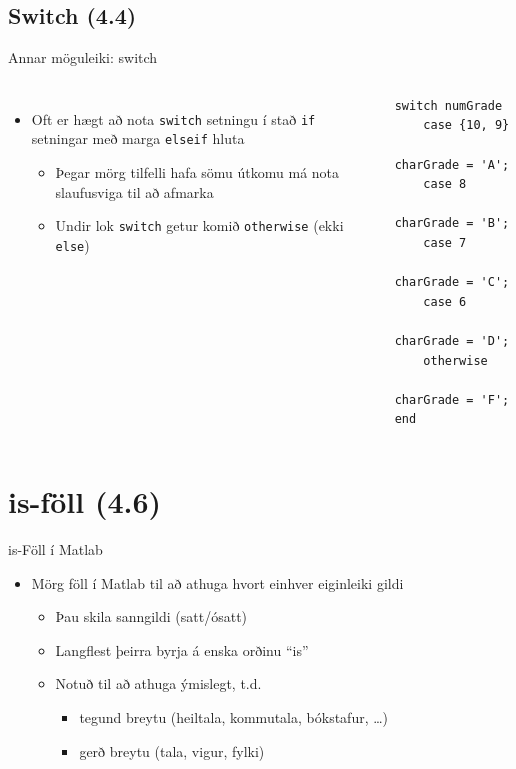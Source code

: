 \documentclass{beamer}
\begin{document}
\subsection{Switch (4.4)}
\begin{frame}[fragile]{Annar möguleiki: switch}
\begin{columns}
\begin{itemize}
 \item Oft er hægt að nota \texttt{switch} setningu í stað \texttt{if} setningar með marga \texttt{elseif} hluta
 \begin{itemize}
  \item Þegar mörg tilfelli hafa sömu útkomu má nota slaufusviga til að afmarka
  \item Undir lok \texttt{switch} getur komið \texttt{otherwise} (ekki \texttt{else})
 \end{itemize}

\end{itemize}

\vspace{\baselineskip}
\begin{verbatim}
switch numGrade
    case {10, 9}
        charGrade = 'A';
    case 8
        charGrade = 'B';
    case 7
        charGrade = 'C';
    case 6
        charGrade = 'D';
    otherwise
        charGrade = 'F';
end
\end{verbatim}
\end{columns}
\end{frame}

\section{is-föll (4.6)}

\begin{frame}{is-Föll í Matlab}
\begin{itemize}
 \item Mörg föll í Matlab til að athuga hvort einhver eiginleiki gildi
 \begin{itemize}
  \item Þau skila sanngildi (satt/ósatt)
  \item Langflest þeirra byrja á enska orðinu ``is''
  \item Notuð til að athuga ýmislegt, t.d.
  \begin{itemize}
   \item tegund breytu (heiltala, kommutala, bókstafur, \ldots)
   \item gerð breytu (tala, vigur, fylki)
  \end{itemize}
 \end{itemize}
\end{itemize}
\end{frame}
\end{document}
